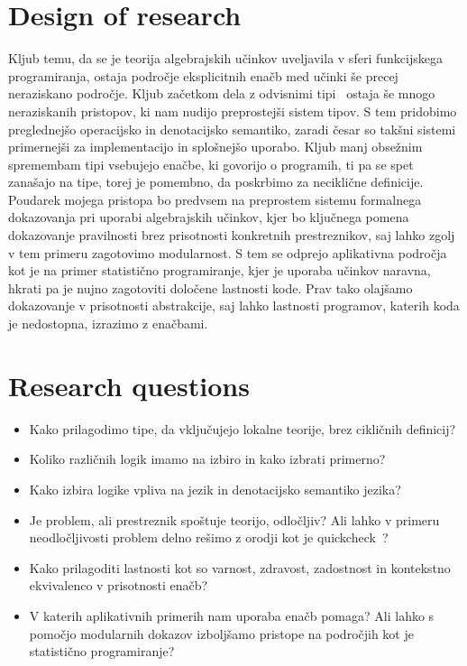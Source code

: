 \documentclass{article}
\begin{document}
\section*{Design of research}

Kljub temu, da se je teorija algebrajskih učinkov uveljavila v sferi funkcijskega programiranja, ostaja področje eksplicitnih enačb med učinki še precej neraziskano področje. Kljub začetkom dela z odvisnimi tipi~\cite{DBLP:journals/pacmpl/Ahman18} ostaja še mnogo neraziskanih pristopov, ki nam nudijo preprostejši sistem tipov. S tem pridobimo preglednejšo operacijsko in denotacijsko semantiko, zaradi česar so takšni sistemi primernejši za implementacijo in splošnejšo uporabo. Kljub manj obsežnim spremembam tipi vsebujejo enačbe, ki govorijo o programih, ti pa se spet zanašajo na tipe, torej je pomembno, da poskrbimo za neciklične definicije. Poudarek mojega pristopa bo predvsem na preprostem sistemu formalnega dokazovanja pri uporabi algebrajskih učinkov, kjer bo ključnega pomena dokazovanje pravilnosti brez prisotnosti konkretnih prestreznikov, saj lahko zgolj v tem primeru zagotovimo modularnost. S tem se odprejo aplikativna področja kot je na primer statistično programiranje, kjer je uporaba učinkov naravna, hkrati pa je nujno zagotoviti določene lastnosti kode. Prav tako olajšamo dokazovanje v prisotnosti abstrakcije, saj lahko lastnosti programov, katerih koda je nedostopna, izrazimo z enačbami.

\section*{Research questions}

\begin{itemize}
  \item Kako prilagodimo tipe, da vključujejo lokalne teorije, brez cikličnih definicij?
  \item Koliko različnih logik imamo na izbiro in kako izbrati primerno?
  \item Kako izbira logike vpliva na jezik in denotacijsko semantiko jezika?
  \item Je problem, ali prestreznik spoštuje teorijo, odločljiv? Ali lahko v primeru neodločljivosti problem delno rešimo z orodji kot je quickcheck~\cite{DBLP:conf/icfp/ClaessenH00}?
  \item Kako prilagoditi lastnosti kot so varnost, zdravost, zadostnost in kontekstno ekvivalenco v prisotnosti enačb?
  \item V katerih aplikativnih primerih nam uporaba enačb pomaga? Ali lahko s pomočjo modularnih dokazov izboljšamo pristope na področjih kot je statistično programiranje?
\end{itemize}
\end{document}
